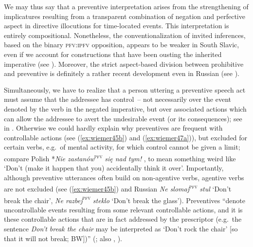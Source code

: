\documentclass[output=paper,colorlinks,citecolor=brown]{langscibook}
\begin{document}
We may thus say that a preventive interpretation arises from the strengthening of implicatures resulting from a transparent combination of negation and perfective aspect in directive illocutions for time-located events. This interpretation is entirely compositional. Nonetheless, the conventionalization of invited inferences, based on the binary \textsc{pfv:ipfv} opposition, appears to be weaker in South Slavic, even if we account for constructions that have been ousting the inherited imperative (see ). Moreover, the strict aspect-based division between prohibitive and preventive is definitely a rather recent development even in Russian (see ). 


Simultaneously, we have to realize that a person uttering a preventive speech act must assume that the addressee has control~– not necessarily over the event denoted by the verb in the negated imperative, but over associated actions which can allow the addressee to avert the undesirable event (or its consequences); see  in . Otherwise we could hardly explain why preventives are frequent with controllable actions (see (\ref{ex:wiemer45b}) and (\ref{ex:wiemer47a})), but excluded for certain verbs, e.g.\ of mental activity, for which control cannot be given a limit; compare Polish   *\textit{Nie zastanów}\textsc{\textsuperscript{pfv}} \textit{się nad tym!} \citep[103]{Holvoet1989}, to mean something weird like `Don't (make it happen that you) accidentally think it over'. Importantly, although preventive utterances often build on non-agentive verbs, agentive verbs are not excluded (see (\ref{ex:wiemer45b}) and Russian \textit{Ne slomaj}\textsc{\textsuperscript{pfv}} \textit{stul} `Don't break the chair', \textit{Ne razbej}\textsc{\textsuperscript{pfv}} \textit{steklo} `Don't break the glass'). Preventives ``denote uncontrollable events resulting from some relevant controllable actions, and it is these controllable actions that are in fact addressed by the prescriptor (e.g.\ the sentence \textit{Don't break the chair} may be interpreted as `Don't rock the chair' [so that it will not break; BW])'' (\citealt[38]{BirjulinXrakovskij2001}; also \citealt{Xrakovskij1990}, \citealt{Birjulin1992}).
\end{document}
